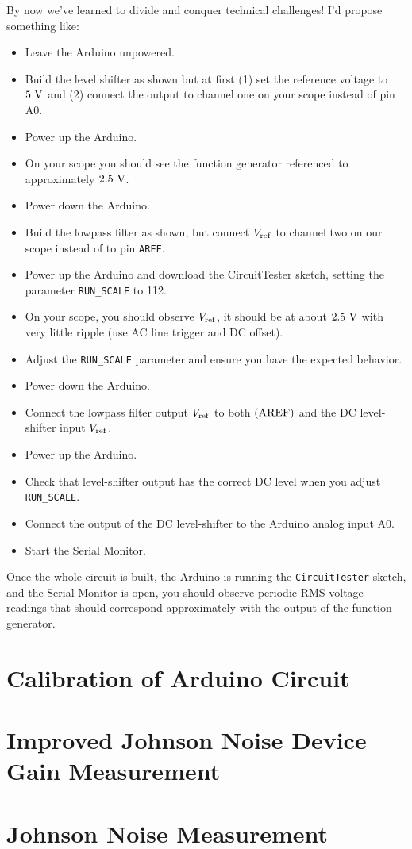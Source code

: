 \documentclass[12pt]{article}
\begin{document}
By now we've learned to divide and conquer technical challenges!  I'd propose something like:
\begin{itemize}
\item Leave the Arduino unpowered.
\item Build the level shifter as shown but at first (1) set the reference voltage to $5~\rm V$ and (2) connect the output to channel one on your scope instead of pin A0.
\item Power up the Arduino.
\item On your scope you should see the function generator referenced to approximately $2.5~\rm V$.
\item Power down the Arduino.
\item Build the lowpass filter as shown, but  connect $V_{\rm ref}$ to channel two on our scope instead of to pin {\tt AREF}.
\item Power up the Arduino and download the {\rm CircuitTester} sketch, setting the parameter {\tt RUN\_SCALE} to 112.
\item On your scope, you should observe $V_{\rm ref}$, it should be at about $2.5~\rm V$ with very little ripple (use AC line trigger and DC offset).
\item Adjust the {\tt RUN\_SCALE} parameter and ensure you have the expected behavior.
\item Power down the Arduino.
\item Connect the lowpass filter output $V_{\rm ref}$ to both $({\rm AREF})$ and the DC level-shifter input $V_{\rm ref}$.
\item Power up the Arduino.
\item Check that level-shifter output has the correct DC level when you adjust {\tt RUN\_SCALE}.
\item Connect the output of the DC level-shifter to the Arduino analog input A0.
\item Start the Serial Monitor.
\end{itemize}

Once the whole circuit is built, the Arduino is running the {\tt CircuitTester} sketch, and the Serial Monitor is open, you should observe periodic RMS voltage readings that should correspond approximately with the output of the function generator.

\section{Calibration of Arduino Circuit}

\section{Improved Johnson Noise Device Gain Measurement}


\section{Johnson Noise Measurement}
\end{document}
